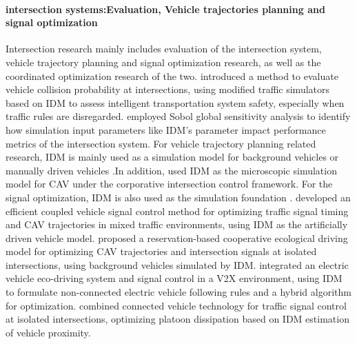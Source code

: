 \documentclass[a4paper,fleqn]{cas-sc}
\begin{document}
\paragraph{\textbf{intersection systems:Evaluation, Vehicle trajectories planning and signal optimization}}
Intersection research mainly includes evaluation of the intersection system, vehicle trajectory planning and signal optimization research, as well as the coordinated optimization research of the two.\cite{joererVehicularNetworkingPerspectiveEstimating2014a} introduced a method to evaluate vehicle collision probability at intersections, using modified traffic simulators based on IDM to assess intelligent transportation system safety, especially when traffic rules are disregarded. \cite{schrader_global_2024} employed Sobol global sensitivity analysis to identify how simulation input parameters like IDM's parameter impact performance metrics of the intersection system. For vehicle trajectory planning related research, IDM is mainly used as a simulation model for background vehicles or manually driven vehicles \citep{chen_human-like_2023,dong_comparative_2022,ghosh_traffic_2022,guoCoordinationConnectedAutomatedVehicles2023a,jiangEcoApproachingIsolatedSignalized2017a,medina_cooperative_2018,stebbinsCharacterisingGreenLightOptimal2017a,wang_learning_2023,xiaoDecisionMakingAutonomousVehiclesRandom2024a,zhangPlatoonCenteredControlEcoDrivingSignalized2023b,zhang_risk-aware_2023}.In addition,\cite{zhouCooperativeSignalFreeIntersectionControl2022b} used IDM as the microscopic simulation model for CAV under the corporative intersection control framework. For the signal optimization, IDM is also used as the simulation foundation \citep{cao_gain_2022,sohn_waterfilling_2023,yang_enhancing_2024}. \cite{duCoupledVehicleSignalControlMethod2021b} developed an efficient coupled vehicle signal control method for optimizing traffic signal timing and CAV trajectories in mixed traffic environments, using IDM as the artificially driven vehicle model. \cite{huang_reservation-based_2023} proposed a reservation-based cooperative ecological driving model for optimizing CAV trajectories and intersection signals at isolated intersections, using background vehicles simulated by IDM. \cite{liEcoDrivingSystemElectricVehicles2018a} integrated an electric vehicle eco-driving system and signal control in a V2X environment, using IDM to formulate non-connected electric vehicle following rules and a hybrid algorithm for optimization. \cite{liang_equitable_2020} combined connected vehicle technology for traffic signal control at isolated intersections, optimizing platoon dissipation based on IDM estimation of vehicle proximity.
\end{document}
